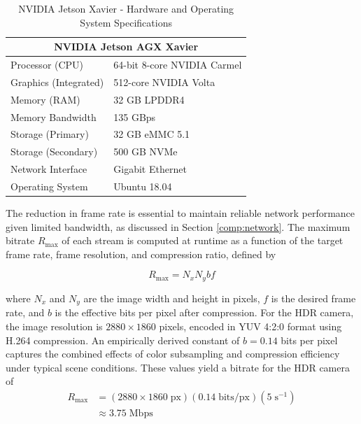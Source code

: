 \documentclass{erauthesis}
\begin{document}
\begin{table}[htpb]
\centering
\begin{tabular}{ll}
\hline
\multicolumn{2}{c}{NVIDIA Jetson AGX Xavier} \\
\hline
\hline
Processor (CPU) & 64-bit 8-core NVIDIA Carmel \\
Graphics (Integrated) & 512-core NVIDIA Volta \\
Memory (RAM) & 32 GB LPDDR4 \\
Memory Bandwidth & 135 GBps \\
Storage (Primary) & 32 GB eMMC 5.1 \\
Storage (Secondary) & 500 GB NVMe \\
Network Interface & Gigabit Ethernet \\
Operating System & Ubuntu 18.04 \\
\hline
\end{tabular}
\caption{NVIDIA Jetson Xavier - Hardware and Operating System Specifications}
\label{table:Xavier_hardware}
\end{table}

The reduction in frame rate is essential to maintain reliable network performance given limited bandwidth, as discussed in Section \ref{comp:network}. 
The maximum bitrate $R_{\text{max}}$ of each stream is computed at runtime as a function of the target frame rate, frame resolution, and compression ratio, defined by

\begin{equation}
    R_{\text{max}} = N_x N_y b f
\end{equation}

where $N_x$ and $N_y$ are the image width and height in pixels, $f$ is the desired frame rate, and $b$ is the effective bits per pixel after compression.
For the HDR camera, the image resolution is $2880 \times 1860$ pixels, encoded in YUV 4:2:0 format using H.264 compression.
An empirically derived constant of $b = 0.14$ bits per pixel captures the combined effects of color subsampling and compression efficiency under typical scene conditions.
These values yield a bitrate for the HDR camera of
\begin{equation}
    \begin{split}
        R_{\text{max}} & = (2880 \times 1860\; \text{px}) (0.14 \;\text{bits/px})(5\;\text{s}^{-1})  \\
        & \approx 3.75\; \text{Mbps}
    \end{split}
\end{equation}
\end{document}
